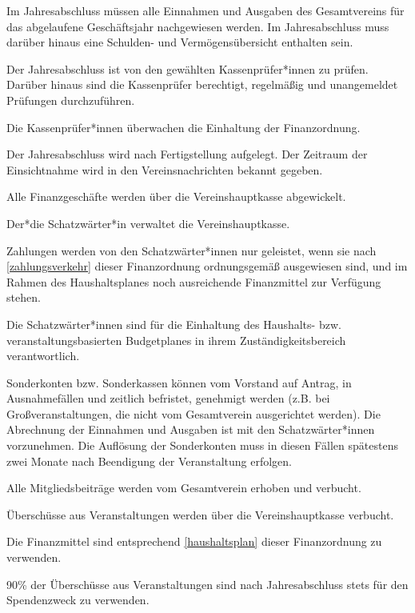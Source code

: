 \begin{finanz}

  Im Jahresabschluss müssen alle Einnahmen und Ausgaben des Gesamtvereins für das abgelaufene Geschäftsjahr nachgewiesen werden. Im Jahresabschluss muss darüber hinaus eine Schulden- und Vermögensübersicht enthalten sein.

  Der Jahresabschluss ist von den gewählten Kassenprüfer*innen zu prüfen. Darüber hinaus sind die Kassenprüfer berechtigt, regelmä\ss{}ig und unangemeldet Prüfungen durchzuführen.

  Die Kassenprüfer*innen überwachen die Einhaltung der Finanzordnung.

  Der Jahresabschluss wird nach Fertigstellung aufgelegt. Der Zeitraum der Einsichtnahme wird in den Vereinsnachrichten bekannt gegeben.


  Alle Finanzgeschäfte werden über die Vereinshauptkasse abgewickelt.

  Der*die Schatzwärter*in verwaltet die Vereinshauptkasse.

  Zahlungen werden von den Schatzwärter*innen nur geleistet, wenn sie nach \ref{zahlungsverkehr} dieser Finanzordnung ordnungsgemä\ss{} ausgewiesen sind, und im Rahmen des Haushaltsplanes noch ausreichende Finanzmittel zur Verfügung stehen.

  Die Schatzwärter*innen sind für die Einhaltung des Haushalts- bzw. veranstaltungsbasierten Budgetplanes in ihrem Zuständigkeitsbereich verantwortlich.

  Sonderkonten bzw. Sonderkassen können vom Vorstand auf Antrag, in Ausnahmefällen und zeitlich befristet, genehmigt werden (z.B. bei Gro\ss{}veranstaltungen, die nicht vom Gesamtverein ausgerichtet werden). Die Abrechnung der Einnahmen und Ausgaben ist mit den Schatzwärter*innen vorzunehmen. Die Auflösung der Sonderkonten muss in diesen Fällen spätestens zwei Monate nach Beendigung der Veranstaltung erfolgen.


  Alle Mitgliedsbeiträge werden vom Gesamtverein erhoben und verbucht.

  Überschüsse aus Veranstaltungen werden über die Vereinshauptkasse verbucht.

  Die Finanzmittel sind entsprechend \ref{haushaltsplan} dieser Finanzordnung zu verwenden.

  90\% der Überschüsse aus Veranstaltungen sind nach Jahresabschluss stets für den Spendenzweck zu verwenden.


\end{finanz}
